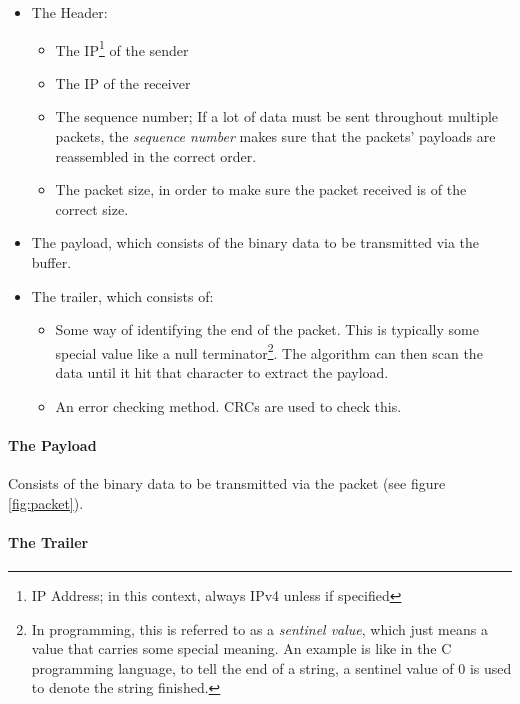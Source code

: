 \documentclass[../main.tex]{subfiles}
\begin{document}
\begin{itemize}

\item The Header:
    \begin{itemize}
    \item The IP\footnote{IP Address; in this context, always IPv4 unless if specified} of the sender
    \item The IP of the receiver
    \item The sequence number; If a lot of data must be sent throughout multiple packets, the
          \emph{sequence number} makes sure that the packets' payloads are reassembled in the correct order.
    \item The packet size, in order to make sure the packet received is of the correct size.
    \end{itemize}

\item The payload, which consists of the binary data to be transmitted via the buffer.

\item The trailer, which consists of:
    \begin{itemize}

    \item Some way of identifying the end of the packet. This is typically some special value like a null terminator\footnote{In programming,
          this is referred to as a \emph{sentinel value}, which just means a value that carries some special meaning. An example is like in the
          C programming language, to tell the end of a string, a sentinel value of 0 is used to denote the string finished.}. The algorithm can
          then scan the data until it hit that character to extract the payload.
    \item An error checking method. CRCs are used to check this.
    
    \end{itemize}

\end{itemize}

\paragraph{The Payload}

Consists of the binary data to be transmitted via the packet (see figure \ref{fig:packet}).

\paragraph{The Trailer}
\end{document}
